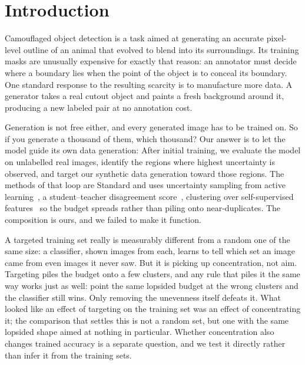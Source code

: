\documentclass{article}
\begin{document}
\section{Introduction}
\label{sec:intro}
Camouflaged object detection is a task aimed at generating an accurate pixel-level outline of an animal that evolved to blend into its surroundings. Its training masks are unusually expensive for exactly that reason: an annotator must
decide where a boundary lies when the point of the object is to conceal its boundary. One standard response to the resulting scarcity is to manufacture more data. A generator takes a real
cutout object and paints a fresh background around it, producing a new labeled pair at no
annotation cost.


Generation is not free either, and every generated image has to be trained on. So if you generate
a thousand of them, which thousand? Our answer is to let the model guide its own data generation: After initial training, we evaluate the model on unlabelled real images, identify the regions where highest uncertainty is observed, and target our synthetic data generation toward those regions. The methods of that loop are
Standard and uses uncertainty sampling from active learning~\citep{settles2009active}, a student--teacher
disagreement score~\citep{tarvainen2017mean}, clustering over self-supervised
features~\citep{oquab2024dinov2} so the budget spreads rather than piling onto near-duplicates. The
composition is ours, and we failed to make it function.


A targeted training set really is measurably different from a random one of the same size: a classifier, shown images from each, learns to tell which set an image came from even images it never saw. But it is picking up concentration, not aim. Targeting piles the budget onto a few clusters, and any rule that piles it the same way works just as well: point the same lopsided budget at the wrong clusters and the classifier still wins. Only removing the unevenness itself defeats it. What looked like an effect of targeting on the training set was an effect of concentrating it; the
comparison that settles this is not a random set, but one with the same lopsided shape
aimed at nothing in particular. Whether concentration also changes trained accuracy is a separate question, and we
test it directly rather than infer it from the training sets.
\end{document}
